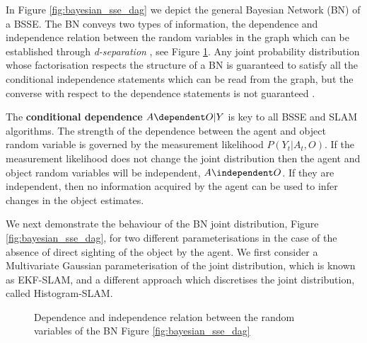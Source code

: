 In Figure \ref{fig:bayesian_sse_dag} we depict the general Bayesian Network (BN) of a BSSE. The BN conveys two types of
information, the dependence and independence relation between the random variables in the graph which can be established
through \textit{d-separation} \cite{BayesBall}, see Figure \ref{fig:ch5_dseperation}. Any joint probability distribution 
whose factorisation  respects the structure of a BN is guaranteed to satisfy all the conditional independence 
statements which can be read from the graph, but the converse with respect to the dependence statements is 
not guaranteed \cite[p.43]{barberBRML2012}. 

The \textbf{conditional dependence} $A \dependent O | Y$ is key to all BSSE and SLAM algorithms. The strength of the dependence 
between the agent and object random variable is governed by the measurement likelihood $P(Y_t|A_t,O)$. If the measurement likelihood does not change the 
joint distribution then the agent and object random variables will be independent, $A \independent O$. If they are independent, 
then no information acquired by the agent can be used to infer changes in the object estimates.

We next demonstrate the behaviour of the BN joint distribution, Figure \ref{fig:bayesian_sse_dag}, for two different parameterisations 
in the case of the absence of direct sighting of the object by the agent. We first consider a
Multivariate Gaussian parameterisation of the joint distribution, which is known as EKF-SLAM, and 
a different approach which discretises the joint distribution, called Histogram-SLAM.

\begin{figure}
\centering
{}%
\caption{Dependence and independence relation between the random variables of the BN Figure \ref{fig:bayesian_sse_dag}}
 \label{fig:ch5_dseperation}
\end{figure}

